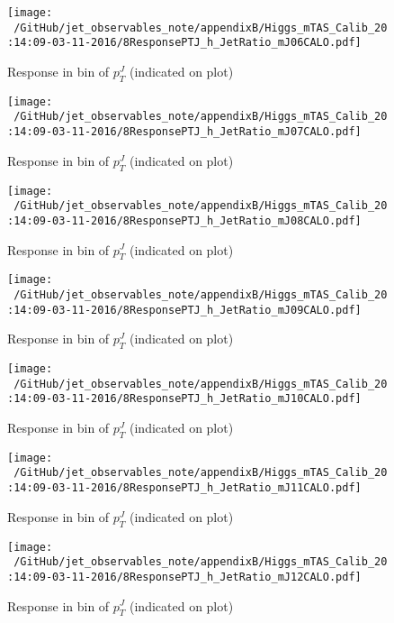\begin{figure}

\texttt{[image: ~/GitHub/jet\_observables\_note/appendixB/Higgs\_mTAS\_Calib\_20:14:09-03-11-2016/8ResponsePTJ\_h\_JetRatio\_mJ06CALO.pdf]}
\caption{Response in bin of  $p_{T}^{J}$ (indicated on plot)} 

\end{figure}

%
\begin{figure}

\texttt{[image: ~/GitHub/jet\_observables\_note/appendixB/Higgs\_mTAS\_Calib\_20:14:09-03-11-2016/8ResponsePTJ\_h\_JetRatio\_mJ07CALO.pdf]}
\caption{Response in bin of  $p_{T}^{J}$ (indicated on plot)} 

\end{figure}


\begin{figure}

\texttt{[image: ~/GitHub/jet\_observables\_note/appendixB/Higgs\_mTAS\_Calib\_20:14:09-03-11-2016/8ResponsePTJ\_h\_JetRatio\_mJ08CALO.pdf]}
\caption{Response in bin of  $p_{T}^{J}$ (indicated on plot)} 

\end{figure}

\begin{figure}

\texttt{[image: ~/GitHub/jet\_observables\_note/appendixB/Higgs\_mTAS\_Calib\_20:14:09-03-11-2016/8ResponsePTJ\_h\_JetRatio\_mJ09CALO.pdf]}
\caption{Response in bin of  $p_{T}^{J}$ (indicated on plot)} 

\end{figure}

\begin{figure}

\texttt{[image: ~/GitHub/jet\_observables\_note/appendixB/Higgs\_mTAS\_Calib\_20:14:09-03-11-2016/8ResponsePTJ\_h\_JetRatio\_mJ10CALO.pdf]}
\caption{Response in bin of  $p_{T}^{J}$ (indicated on plot)} 

\end{figure}

\begin{figure}

\texttt{[image: ~/GitHub/jet\_observables\_note/appendixB/Higgs\_mTAS\_Calib\_20:14:09-03-11-2016/8ResponsePTJ\_h\_JetRatio\_mJ11CALO.pdf]}
\caption{Response in bin of  $p_{T}^{J}$ (indicated on plot)} 

\end{figure}

\begin{figure}

\texttt{[image: ~/GitHub/jet\_observables\_note/appendixB/Higgs\_mTAS\_Calib\_20:14:09-03-11-2016/8ResponsePTJ\_h\_JetRatio\_mJ12CALO.pdf]}
\caption{Response in bin of  $p_{T}^{J}$ (indicated on plot)} 

\end{figure}
